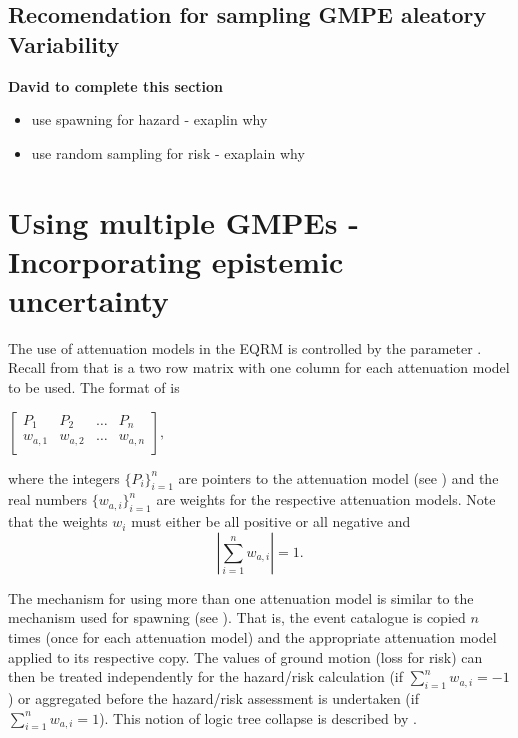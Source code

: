 \subsection{Recomendation for sampling GMPE aleatory Variability}

\textbf{David to complete this section}
\begin{itemize}
\item use spawning for hazard - exaplin why
\item use random sampling for risk - exaplain why
\end{itemize}

\section{Using multiple GMPEs - Incorporating epistemic uncertainty}
\label{sec:attn-multi-attnmodels}

The use of attenuation models in the EQRM is controlled by the
 parameter .
Recall from  that
 is a two row matrix with one column
for each attenuation model to be used. The format of
 is
\begin{center}
\begin{math}
 \left[ \begin{array}{ccccc}
P_1 & P_2 &  \hdots & P_n \\
w_{a,1} & w_{a,2} &  \hdots & w_{a,n} \\
\end{array} \right],
\end{math}
\end{center}
where the integers $\{P_i\}_{i=1}^n$ are pointers to the attenuation
model (see ) and the real numbers
$\{w_{a,i}\}_{i=1}^n$ are weights for the respective attenuation
models. Note that the weights $w_i$ must either be all positive or
all negative and
\begin{equation}
\left|\sum_{i=1}^{n}w_{a,i}\right| = 1.
\end{equation}



The mechanism for using more than one attenuation model is similar
to the mechanism used for spawning (see
). That is, the event catalogue is
copied $n$ times (once for each attenuation model) and the
appropriate attenuation model applied to its respective copy. The
values of ground motion (loss for risk) can then be treated
independently for the hazard/risk calculation (if
$\sum_{i=1}^{n}w_{a,i} = -1$) or aggregated before the hazard/risk
assessment is undertaken (if $\sum_{i=1}^{n}w_{a,i} = 1$). This
notion of logic tree collapse is described by
.



